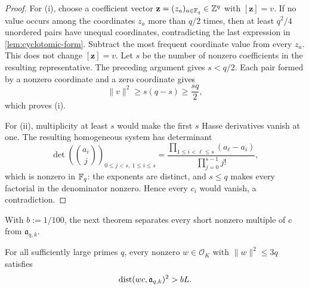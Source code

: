 \begin{proof}
For (i), choose a coefficient vector
$\mathbf z=(z_a)_{a\in\mathbb F_q}\in\mathbb Z^q$ with $[\mathbf z]=v$.  If no value occurs
among the coordinates $z_a$ more than $q/2$ times, then at least $q^2/4$
unordered pairs have unequal coordinates, contradicting the last expression
in \cref{lem:cyclotomic-form}.  Subtract the most frequent coordinate value
from every $z_a$.  This does not change $[\mathbf z]=v$.  Let $s$ be the
number of nonzero coefficients in the resulting representative.  The
preceding argument gives $s<q/2$.  Each pair formed
by a nonzero coordinate and a zero coordinate gives
\[
 \|v\|^2\ge s(q-s)\ge\frac{sq}{2},
\]
which proves (i).

For (ii), multiplicity at least $s$ would make the first $s$ Hasse derivatives
vanish at one.  The resulting homogeneous system has determinant
\[
 \det\left(\binom{a_i}{j}\right)_{
       0\le j<s,\ 1\le i\le s}
 =\frac{\prod_{1\le i<\ell\le s}(a_\ell-a_i)}
        {\prod_{j=0}^{s-1}j!},
\]
which is nonzero in $\mathbb F_q$: the exponents are distinct, and $s\le q$ makes
every factorial in the denominator nonzero.  Hence every $c_i$ would vanish,
a contradiction.
\end{proof}

With $b:=1/100$, the next theorem separates every short nonzero
multiple of $c$ from $\mathfrak a_{q,k}$.
\begin{theorem}
\label{thm:robust-center}
For all sufficiently large primes $q$, every nonzero
$w\in\mathcal{O}_K$ with $\|w\|^2\le3q$ satisfies
\[
 \operatorname{dist}(wc,\mathfrak a_{q,k})^2>bL.
\]
\end{theorem}

